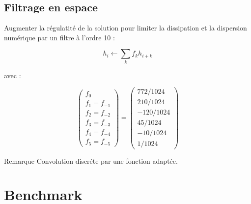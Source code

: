 \documentclass[11pt]{beamer}
\begin{document}
\subsection{Filtrage en espace}
\begin{frame}
Augmenter la régulatité de la solution pour limiter la dissipation et la dispersion numérique par un filtre à l'ordre 10 :

\begin{block}{}
$$h_{i} \leftarrow \sum_{k} f_{k} h_{i+k}$$
\end{block}

avec : 

$$\begin{pmatrix}
f_0 \\ 
f_1 = f_{-1} \\ 
f_2 = f_{-2} \\ 
f_3 = f_{-3} \\ 
f_4 = f_{-4} \\ 
f_5 = f_{-5}
\end{pmatrix} = \begin{pmatrix}
772/1024 \\ 
210/1024 \\ 
-120/1024 \\ 
45/1024 \\ 
-10/1024 \\ 
1/1024
\end{pmatrix} $$

\begin{block}{Remarque}
Convolution discréte par une fonction adaptée.
\end{block}
\end{frame}

\begin{frame}
\tableofcontents
\end{frame}


\section{Benchmark}
\end{document}
